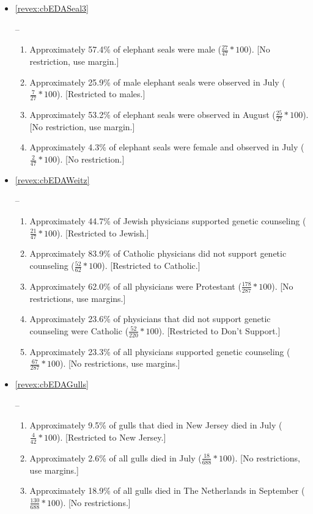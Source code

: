 \documentclass[10pt,openany]{book}\usepackage[]{graphicx}\usepackage[]{color}
\begin{document}
\begin{itemize}
  \item \hypertarget{ans:cbEDASeal3}{\ref{revex:cbEDASeal3}} --
  \begin{enumerate}
    \item Approximately 57.4\% of elephant seals were male ($\frac{27}{47}*100$).  [No restriction, use margin.]
    \item Approximately 25.9\% of male elephant seals were observed in July ($\frac{7}{27}*100$).  [Restricted to males.]
    \item Approximately 53.2\% of elephant seals were observed in August ($\frac{25}{27}*100$).  [No restriction, use margin.]
    \item Approximately 4.3\% of elephant seals were female and observed in July ($\frac{2}{47}*100$).  [No restriction.]
  \end{enumerate}

  \item \hypertarget{ans:cbEDAWeitz}{\ref{revex:cbEDAWeitz}} --
  \begin{enumerate}
    \item Approximately 44.7\% of Jewish physicians supported genetic counseling ($\frac{21}{47}*100$).  [Restricted to Jewish.]
    \item Approximately 83.9\% of Catholic physicians did not support genetic counseling ($\frac{52}{62}*100$).  [Restricted to Catholic.]
    \item Approximately 62.0\% of all physicians were Protestant ($\frac{178}{287}*100$).  [No restrictions, use margins.]
    \item Approximately 23.6\% of physicians that did not support genetic counseling were Catholic ($\frac{52}{220}*100$).  [Restricted to Don't Support.]
    \item Approximately 23.3\% of all physicians supported genetic counseling ($\frac{67}{287}*100$).  [No restrictions, use margins.]
  \end{enumerate}

  \item \hypertarget{ans:cbEDAGulls}{\ref{revex:cbEDAGulls}} --
  \begin{enumerate}
    \item Approximately 9.5\% of gulls that died in New Jersey died in July ($\frac{4}{42}*100$).  [Restricted to New Jersey.]
    \item Approximately 2.6\% of all gulls died in July ($\frac{18}{688}*100$).  [No restrictions, use margins.]
    \item Approximately 18.9\% of all gulls died in The Netherlands in September ($\frac{130}{688}*100$).  [No restrictions.]
  \end{enumerate}


\end{itemize}
\end{document}
